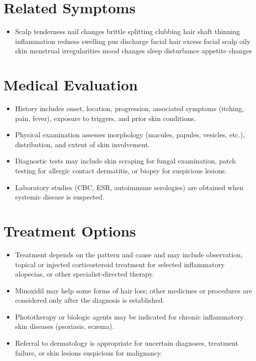 \section*{Related Symptoms}
\begin{itemize}
  \item Scalp tenderness nail changes brittle splitting clubbing hair shaft thinning inflammation redness swelling pus discharge facial hair excess facial scalp oily skin menstrual irregularities mood changes sleep disturbance appetite changes
\end{itemize}

\section*{Medical Evaluation}
\begin{itemize}
  \item History includes onset, location, progression, associated symptoms (itching, pain, fever), exposure to triggers, and prior skin conditions.
  \item Physical examination assesses morphology (macules, papules, vesicles, etc.), distribution, and extent of skin involvement.
  \item Diagnostic tests may include skin scraping for fungal examination, patch testing for allergic contact dermatitis, or biopsy for suspicious lesions.
  \item Laboratory studies (CBC, ESR, autoimmune serologies) are obtained when systemic disease is suspected.
\end{itemize}

\section*{Treatment Options}
\begin{itemize}
  \item Treatment depends on the pattern and cause and may include observation, topical or injected corticosteroid treatment for selected inflammatory alopecias, or other specialist-directed therapy.
  \item Minoxidil may help some forms of hair loss; other medicines or procedures are considered only after the diagnosis is established.
  \item Phototherapy or biologic agents may be indicated for chronic inflammatory skin diseases (psoriasis, eczema).
  \item Referral to dermatology is appropriate for uncertain diagnoses, treatment failure, or skin lesions suspicious for malignancy.
\end{itemize}

